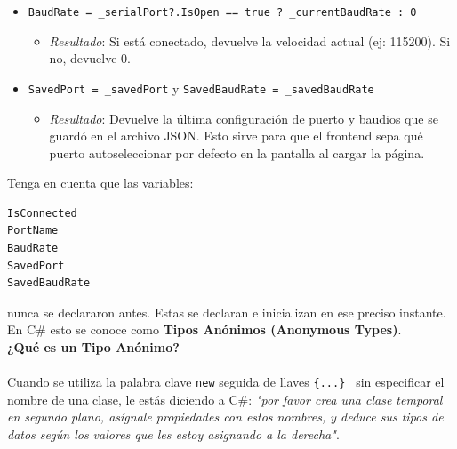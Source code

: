\documentclass[
10pt, %
a4paper, %
oneside, %
headinclude,footinclude, %
BCOR5mm, %
]{scrartcl}
\begin{document}
\begin{enumerate}
\begin{itemize}
\begin{itemize}
			\item \textit{Resultado}: Si el puerto está abierto, devuelve el nombre del puerto activo (ej: "COM3"). Si está cerrado, devuelve \texttt{null}.
		\end{itemize}
		\item \texttt{BaudRate = \_serialPort?.IsOpen == true ? \_currentBaudRate : 0}
		\begin{itemize}
			\item \textit{Resultado}: Si está conectado, devuelve la velocidad actual (ej: 115200). Si no, devuelve 0.
		\end{itemize}
		\item \texttt{SavedPort = \_savedPort} y \texttt{SavedBaudRate = \_savedBaudRate}
		\begin{itemize}
			\item \textit{Resultado}: Devuelve la última configuración de puerto y baudios que se guardó en el archivo JSON. Esto sirve para que el frontend sepa qué puerto autoseleccionar por defecto en la pantalla al cargar la página.
		\end{itemize}
	\end{itemize}
\end{enumerate}

Tenga en cuenta que las variables:
\begin{lstlisting}[style=csharpStyle]
IsConnected
PortName 
BaudRate
SavedPort 
SavedBaudRate 
\end{lstlisting}

nunca se declararon antes. Estas se declaran e inicializan en ese preciso instante. En C\# esto se conoce como \textbf{Tipos Anónimos (Anonymous Types)}. \\

\newpage
\textbf{\large ¿Qué es un Tipo Anónimo?}\\\\
Cuando se utiliza la palabra clave \texttt{new} seguida de llaves \texttt{\{...\} } sin especificar el nombre de una clase, le estás diciendo a C\#: \textit{"por favor crea una clase temporal en segundo plano, asígnale propiedades con estos nombres, y deduce sus tipos de datos según los valores que les estoy asignando a la derecha"}.
\end{document}
